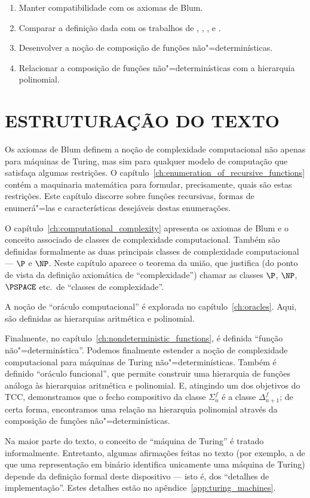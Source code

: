 \begin{enumerate}
    \item Manter compatibilidade com os axiomas de Blum.
    \item Comparar a definição dada
        com os trabalhos de ,
        ,
        ,
        e .
    \item Desenvolver a noção de composição de funções não"=determinísticas.
    \item Relacionar a composição de funções não"=determinísticas
        com a hierarquia polinomial.
\end{enumerate}

\section{ESTRUTURAÇÃO DO TEXTO}

Os axiomas de Blum definem a noção de complexidade computacional
não apenas para máquinas de Turing,
mas sim para qualquer modelo de computação que satisfaça algumas restrições.
O capítulo~\ref{ch:enumeration_of_recursive_functions}
contém a maquinaria matemática para formular,
precisamente,
quais são estas restrições.
Este capítulo discorre sobre funções recursivas,
formas de enumerá"=las
e características desejáveis destas enumerações.

O capítulo~\ref{ch:computational_complexity}
apresenta os axiomas de Blum
e o conceito associado de classes de complexidade computacional.
Também são definidas formalmente
as duas principais classes de complexidade computacional
--- $\P$ e $\NP$.
Neste capítulo aparece o teorema da união,
que justifica
(do ponto de vista da definição axiomática de ``complexidade'')
chamar as classes $\P$, $\NP$, $\PSPACE$ etc.\ de ``classes de complexidade''.

A noção de ``oráculo computacional'' é explorada no capítulo~\ref{ch:oracles}.
Aqui,
são definidas as hierarquias aritmética e polinomial.

Finalmente,
no capítulo~\ref{ch:nondeterministic_functions},
é definida ``função não"=determinística''.
Podemos finalmente estender a noção de complexidade computacional
para máquinas de Turing não"=determinísticas.
Também é definido ``oráculo funcional'',
que permite construir uma hierarquia de funções
análoga às hierarquias aritmética e polinomial.
E, atingindo um dos objetivos do TCC,
demonstramos que o fecho compositivo da classe $\Sigma_n^f$
é a classe $\Delta_{n+1}^f$;
de certa forma,
encontramos uma relação na hierarquia polinomial
através da composição de funções não"=determinísticas.

Na maior parte do texto,
o conceito de ``máquina de Turing'' é tratado informalmente.
Entretanto,
algumas afirmações feitas no texto
(por exemplo, a de que uma representação em binário
identifica unicamente uma máquina de Turing)
depende da definição formal deste dispositivo
--- isto é, dos ``detalhes de implementação''.
Estes detalhes estão no apêndice~\ref{app:turing_machines}.

